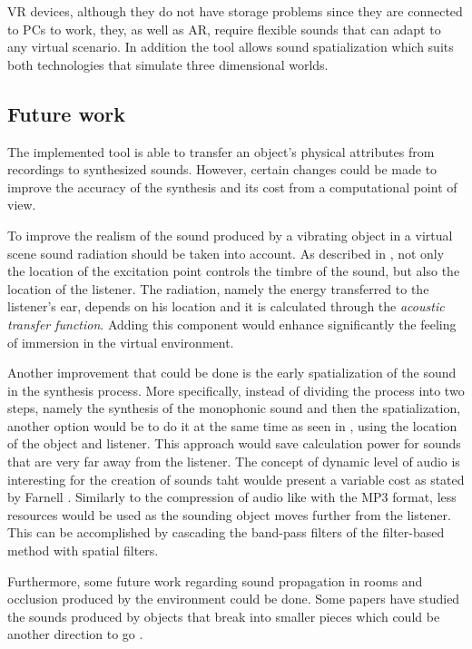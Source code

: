 \gls{VR} devices, although they do not have storage problems since they are connected to PCs to work, they, as well as \gls{AR}, require flexible sounds that can adapt to any virtual scenario. In addition the tool allows sound spatialization which suits both technologies that simulate three dimensional worlds.

\subsection{Future work}


The implemented tool is able to transfer an object's physical attributes from recordings to synthesized sounds. However, certain changes could be made to improve the accuracy of the synthesis and its cost from a computational point of view.

To improve the realism of the sound produced by a vibrating object in a virtual scene sound radiation should be taken into account. As described in \cite{corbett2007timbrefields}, not only the location of the excitation point controls the timbre of the sound, but also the location of the listener. The radiation, namely the energy transferred to the listener's ear, depends on his location and it is calculated through the \textit{acoustic transfer function}. Adding this component would enhance significantly the feeling of immersion in the virtual environment.

Another improvement that could be done is the early spatialization of the sound in the synthesis process. More specifically, instead of dividing the process into two steps, namely the synthesis of the monophonic sound and then the spatialization, another option would be to do it at the same time as seen in \cite{verron2010synthese}, using the location of the object and listener. This approach would save calculation power for sounds that are very far away from the listener. The concept of dynamic level of audio is interesting for the creation of sounds taht woulde present a variable cost as stated by Farnell \cite{farnell2010designing}. Similarly to the compression of audio like with the MP3 format, less resources would be used as the sounding object moves further from the listener. This can be accomplished by cascading the band-pass filters of the filter-based method with spatial filters.    

Furthermore, some future work regarding sound propagation in rooms and occlusion produced by the environment could be done. Some papers have studied the sounds produced by objects that break into smaller pieces which could be another direction to go \cite{zheng2010rigid}.


